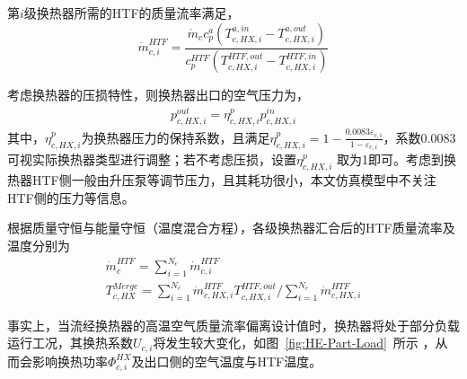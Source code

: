 第$i$级换热器所需的HTF的质量流率满足，
\begin{equation}
\label{equ:he-comp-mass-flow}
\dot m_{c,i}^{HTF} = \frac{{{{\dot m}_c}c_p^a({T_{c,HX,i}^{a,in} - T_{c,HX,i}^{a,out}} )}}{{c_p^{HTF}( {T_{c,HX,i}^{HTF,out} - T_{c,HX,i}^{HTF,in}})}}
\end{equation}

考虑换热器的压损特性，则换热器出口的空气压力为，
\begin{subequations}
\begin{gather}
p_{c,HX,i}^{out} = \eta _{c,HX,i}^pp_{c,HX,i}^{in}\label{equ:he-comp-pressure-out}
\end{gather}
\end{subequations}
其中，$\eta _{c,HX,i}^p$为换热器压力的保持系数\cite{Thesis-Lixuemei}，且满足$\eta _{c,HX,i}^p = 1 - \frac{{0.0083{\varepsilon _{c,i}}}}{{1 - {\varepsilon _{c,i}}}}$，系数0.0083可视实际换热器类型进行调整；若不考虑压损，设置$\eta _{c,HX,i}^p$ 取为1即可。考虑到换热器HTF侧一般由升压泵等调节压力，且其耗功很小，本文仿真模型中不关注HTF侧的压力等信息。

根据质量守恒与能量守恒（温度混合方程），各级换热器汇合后的HTF质量流率及温度分别为
\begin{subequations}
\begin{gather}
\dot m_c^{HTF} = \sum\limits_{i = 1}^{{N_c}} {\dot m_{c,i}^{HTF}} \label{equ:he-comp-mix-mass-flow}\\
T_{c,HX}^{Merge} = {{\sum\limits_{i = 1}^{{N_c}} {\dot m_{c,HX,i}^{HTF}T_{c,HX,i}^{HTF,out}} }}/{{\sum\limits_{i = 1}^{{N_c}} {\dot m_{c,HX,i}^{HTF}}}}  \label{equ:he-comp-mix-temp}
\end{gather}
\end{subequations}

事实上，当流经换热器的高温空气质量流率偏离设计值时，换热器将处于部分负载运行工况，其换热系数$U_{c,i}$将发生较大变化，如图~\ref{fig:HE-Part-Load}~所示
\cite{HE-Eff-CN-17,CAES-Review-18-Rui-operation}，从而会影响换热功率$\Phi _{c,i}^{HX}$及出口侧的空气温度与HTF温度。

